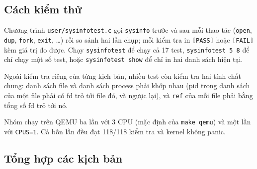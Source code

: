 \subsection{Cách kiểm thử}

Chương trình \texttt{user/sysinfotest.c} gọi \texttt{sysinfo} trước và sau mỗi thao tác (\texttt{open}, \texttt{dup}, \texttt{fork}, \texttt{exit}, \ldots) rồi so sánh hai lần chụp; mỗi kiểm tra in \texttt{[PASS]} hoặc \texttt{[FAIL]} kèm giá trị đo được. Chạy \texttt{sysinfotest} để chạy cả 17 test, \texttt{sysinfotest 5 8} để chỉ chạy một số test, hoặc \texttt{sysinfotest show} để chỉ in hai danh sách hiện tại.

Ngoài kiểm tra riêng của từng kịch bản, nhiều test còn kiểm tra hai tính chất chung: danh sách file và danh sách process phải khớp nhau (pid trong danh sách của một file phải có fd trỏ tới file đó, và ngược lại), và \texttt{ref} của mỗi file phải bằng tổng số fd trỏ tới nó.

Nhóm chạy trên QEMU ba lần với 3 CPU (mặc định của \texttt{make qemu}) và một lần với \texttt{CPUS=1}. Cả bốn lần đều đạt 118/118 kiểm tra và kernel không panic.

\subsection{Tổng hợp các kịch bản}

